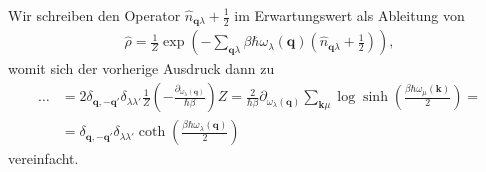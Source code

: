 \documentclass[english, parskip=full]{scrartcl}
\renewcommand{\bra}{}
\renewcommand{\braket}{}
\newcommand{\kla}{}
\renewcommand{\i}{\text{i}}
\newcommand{\e}{\text{e}}
\begin{document}
Wir schreiben den Operator $\hat{n}_{\textbf{q}\lambda} + \frac{1}{2}$ im Erwartungswert als Ableitung von 
\begin{align}
\hat{\rho} = \frac{1}{Z} \exp\kla\left( -\sum_{\textbf{q}\lambda} \beta\hbar \omega_\lambda (\textbf{q}) \kla\left( \hat{n}_{\textbf{q}\lambda} + \frac{1}{2} \right)  \right),
\end{align}
womit sich der vorherige Ausdruck dann zu
\begin{align}
\dots &= 2\delta_{\textbf{q},-\textbf{q}'} \delta_{\lambda\lambda'} \frac{1}{Z} \left(-\frac{\partial_{\omega_\lambda (\textbf{q})}}{\hbar\beta} \right) Z = \frac{2}{\hbar\beta} \partial_{\omega_\lambda (\textbf{q})} \sum_{\textbf{k} \mu} \log \sinh\kla\left( \frac{\beta\hbar\omega_\mu (\textbf{k})}{2} \right) = \\
&= \delta_{\textbf{q},-\textbf{q}'} \delta_{\lambda\lambda'} \coth\kla\left( \frac{\beta\hbar\omega_\lambda ( \textbf{q})}{2} \right)
\end{align}
vereinfacht.
\end{document}
